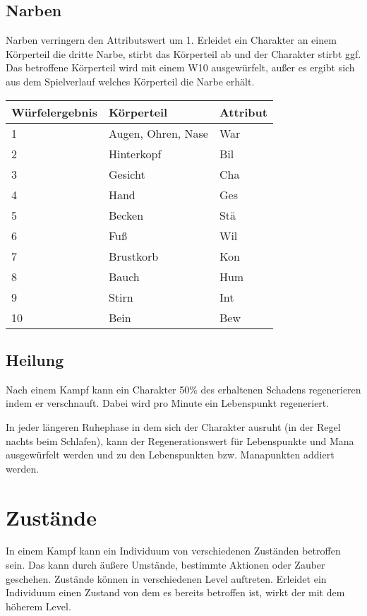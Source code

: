 \documentclass[../../Heldenanleitung2]{subfiles}
\begin{document}
\subsection{Narben}
Narben verringern den Attributswert um 1. Erleidet ein Charakter an einem Körperteil die dritte Narbe, stirbt das Körperteil ab und der Charakter stirbt ggf. Das betroffene Körperteil wird mit einem W10 ausgewürfelt, außer es ergibt sich aus dem Spielverlauf welches Körperteil die Narbe erhält.

{
\begin{center}
\begin{tabular}{|l|l|l|}
\hline
Würfelergebnis & Körperteil & Attribut \\ \hline
1 & Augen, Ohren, Nase & War \\ 
2 & Hinterkopf & Bil \\ 
3 & Gesicht & Cha \\ 
4 & Hand & Ges \\ 
5 & Becken & Stä \\ 
6 & Fuß & Wil \\ 
7 & Brustkorb & Kon \\ 
8 & Bauch & Hum \\ 
9 & Stirn & Int \\ 
10 & Bein & Bew \\ \hline
\end{tabular}
\end{center}
}

\subsection{Heilung}
Nach einem Kampf kann ein Charakter 50\% des erhaltenen Schadens regenerieren indem er verschnauft. Dabei wird pro Minute ein Lebenspunkt regeneriert.

In jeder längeren Ruhephase in dem sich der Charakter ausruht (in der Regel nachts beim Schlafen), kann der Regenerationswert für Lebenspunkte und Mana ausgewürfelt werden und zu den Lebenspunkten bzw. Manapunkten addiert werden.

\section{Zustände}

In einem Kampf kann ein Individuum von verschiedenen Zuständen betroffen sein. Das kann durch äußere Umstände, bestimmte Aktionen oder Zauber geschehen. Zustände können in verschiedenen Level auftreten. Erleidet ein Individuum einen Zustand von dem es bereits betroffen ist, wirkt der mit dem höherem Level.
\end{document}

